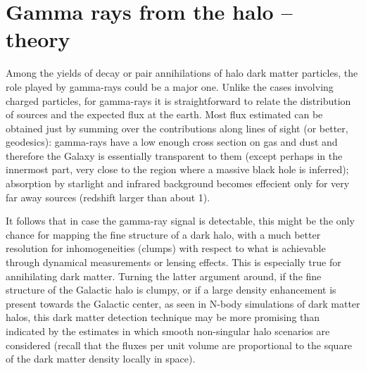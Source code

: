 
\section{Gamma rays from the halo -- theory}
\label{sec:cr_gamma}

Among the yields of decay or pair annihilations of halo dark matter particles,
the role played by gamma-rays could be a major one. Unlike the cases
involving charged particles, for gamma-rays it is straightforward
to relate the distribution of sources and the expected flux
at the earth. Most flux estimated can be obtained just by summing
over the contributions along 
lines of sight (or better, geodesics): gamma-rays have a low 
enough cross section on gas and dust and therefore the Galaxy is 
essentially transparent to them (except perhaps in the innermost part, 
very close to the region where a massive black hole is inferred); 
absorption by starlight and infrared background becomes effecient
only for very far away sources (redshift larger than about 1).

It follows that in case the gamma-ray signal is detectable, 
this might be the only chance for mapping the fine structure of a dark 
halo, with a much better resolution for inhomogeneities (clumps) with 
respect to what is achievable through dynamical measurements or lensing effects. 
This is especially true for annihilating dark matter. 
Turning the latter argument around, if the fine structure of the Galactic 
halo is clumpy, or if a large density enhancement is present towards the 
Galactic center, as seen in N-body simulations of dark matter halos,
this dark matter detection technique may be more promising than indicated 
by the estimates in which smooth non-singular halo 
scenarios are considered (recall that the fluxes per unit volume are 
proportional to the square of the dark matter density locally in space).


